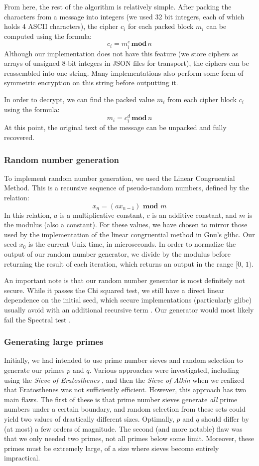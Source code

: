 \documentclass{article}
\begin{document}
From here, the rest of the algorithm is relatively simple. After packing the characters from a message into integers (we used 32 bit integers, each of which holds 4 ASCII characters), the cipher $c_i$ for each packed block $m_i$ can be computed using the formula:
\[ c_i = m_i^e\, \textbf{mod} \, n \]
Although our implementation does not have this feature (we store ciphers as arrays of unsigned 8-bit integers in JSON files for transport), the ciphers can be reassembled into one string. Many implementations also perform some form of symmetric encryption on this string before outputting it.

In order to decrypt, we can find the packed value $m_i$ from each cipher block $c_i$ using the formula:
	\[ m_i = c_i^d \,\textbf{mod}\, n \]
At this point, the original text of the message can be unpacked and fully recovered.

\subsubsection{Random number generation}
To implement random number generation, we used the Linear Congruential Method. This is a recursive sequence of pseudo-random numbers, defined by the relation:
\[ x_n = (ax_{n - 1}) \textbf{ mod } m \]
In this relation, $a$ is a multiplicative constant, $c$ is an additive constant, and $m$ is the modulus (also a constant). For these values, we have chosen to mirror those used by the implementation of the linear congruential method in Gnu's glibc. Our seed $x_0$ is the current Unix time, in microseconds. In order to normalize the output of our random number generator, we divide by the modulus before returning the result of each iteration, which returns an output in the range $[0,\, 1)$.

An important note is that our random number generator is most definitely not secure. While it passes the Chi squared test, we still have a direct linear dependence on the initial seed, which secure implementations (particularly glibc) usually avoid with an additional recursive term \cite{lcm}. Our generator would most likely fail the Spectral test \cite{spectral}.

\subsubsection{Generating large primes}
Initially, we had intended to use prime number sieves and random selection to generate our primes $p$ and $q$. Various approaches were investigated, including using the \textit{Sieve of Eratosthenes} \cite{sieveeratosthenes}, and then the \textit{Sieve of Atkin} \cite{sieveatkin} when we realized that Eratosthenes was not sufficiently efficient. However, this approach has two main flaws. The first of these is that prime number sieves generate \textit{all} prime numbers under a certain boundary, and random selection from these sets could yield two values of drastically different sizes. Optimally, $p$ and $q$ should differ by (at most) a few orders of magnitude. The second (and more notable) flaw was that we only needed two primes, not all primes below some limit. Moreover, these primes must be extremely large, of a size where sieves become entirely impractical.
\end{document}
